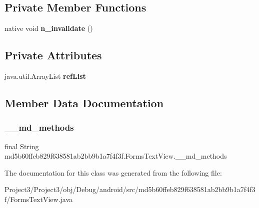\subsection*{Private Member Functions}
\begin{DoxyCompactItemize}
\item 
\mbox{\label{classmd5b60ffeb829f638581ab2bb9b1a7f4f3f_1_1FormsTextView_a89dfc7b60d01058537f74b9c0b254c12}} 
native void {\bfseries n\+\_\+invalidate} ()
\end{DoxyCompactItemize}
\subsection*{Private Attributes}
\begin{DoxyCompactItemize}
\item 
\mbox{\label{classmd5b60ffeb829f638581ab2bb9b1a7f4f3f_1_1FormsTextView_a3da090ab0eccaeff99e949ea5d81c1b2}} 
java.\+util.\+Array\+List {\bfseries ref\+List}
\end{DoxyCompactItemize}


\subsection{Member Data Documentation}
\mbox{\label{classmd5b60ffeb829f638581ab2bb9b1a7f4f3f_1_1FormsTextView_ad4f9b582e68f2509120a1f5414c09541}} 
\subsubsection{\texorpdfstring{\+\_\+\+\_\+md\+\_\+methods}{\_\_md\_methods}}
{\footnotesize\ttfamily final String md5b60ffeb829f638581ab2bb9b1a7f4f3f.\+Forms\+Text\+View.\+\_\+\+\_\+md\+\_\+methods\hspace{0.3cm}{\ttfamily [static]}}



The documentation for this class was generated from the following file\+:\begin{DoxyCompactItemize}
\item 
Project3/\+Project3/obj/\+Debug/android/src/md5b60ffeb829f638581ab2bb9b1a7f4f3f/Forms\+Text\+View.\+java\end{DoxyCompactItemize}
